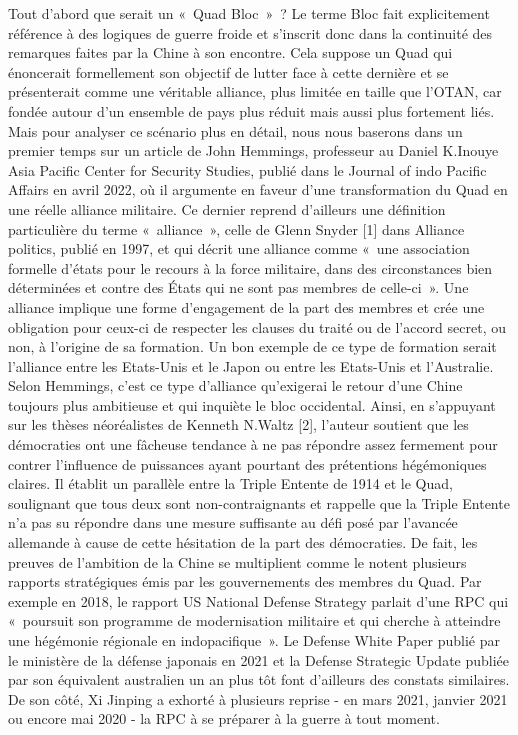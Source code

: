 \documentclass[11pt,a4paper]{article}
\begin{document}
Tout d'abord que serait un «~Quad Bloc~»~? Le terme Bloc fait explicitement référence à des logiques de guerre froide et s'inscrit donc dans la continuité des remarques faites par la Chine à son encontre. Cela suppose un Quad qui énoncerait formellement son objectif de lutter face à cette dernière et se présenterait comme une véritable alliance, plus limitée en taille que l'OTAN, car fondée autour d'un ensemble de pays plus réduit mais aussi plus fortement liés. Mais pour analyser ce scénario plus en détail, nous nous baserons dans un premier temps sur un article de John Hemmings, professeur au Daniel K.Inouye Asia Pacific Center for Security Studies, publié dans le Journal of indo Pacific Affairs en avril 2022, où il argumente en faveur d'une transformation du Quad en une réelle alliance militaire. Ce dernier reprend d'ailleurs une définition particulière du terme «~alliance~», celle de Glenn Snyder {[}1{]} dans Alliance politics, publié en 1997, et qui décrit une alliance comme «~une association formelle d'états pour le recours à la force militaire, dans des circonstances bien déterminées et contre des États qui ne sont pas membres de celle-ci~». Une alliance implique une forme d'engagement de la part des membres et crée une obligation pour ceux-ci de respecter les clauses du traité ou de l'accord secret, ou non, à l'origine de sa formation. Un bon exemple de ce type de formation serait l'alliance entre les Etats-Unis et le Japon ou entre les Etats-Unis et l'Australie. Selon Hemmings, c'est ce type d'alliance qu'exigerai le retour d'une Chine toujours plus ambitieuse et qui inquiète le bloc occidental. Ainsi, en s'appuyant sur les thèses néoréalistes de Kenneth N.Waltz {[}2{]}, l'auteur soutient que les démocraties ont une fâcheuse tendance à ne pas répondre assez fermement pour contrer l'influence de puissances ayant pourtant des prétentions hégémoniques claires. Il établit un parallèle entre la Triple Entente de 1914 et le Quad, soulignant que tous deux sont non-contraignants et rappelle que la Triple Entente n'a pas su répondre dans une mesure suffisante au défi posé par l'avancée allemande à cause de cette hésitation de la part des démocraties. De fait, les preuves de l'ambition de la Chine se multiplient comme le notent plusieurs rapports stratégiques émis par les gouvernements des membres du Quad. Par exemple en 2018, le rapport US National Defense Strategy parlait d'une RPC qui «~poursuit son programme de modernisation militaire et qui cherche à atteindre une hégémonie régionale en indopacifique~». Le Defense White Paper publié par le ministère de la défense japonais en 2021 et la Defense Strategic Update publiée par son équivalent australien un an plus tôt font d'ailleurs des constats similaires. De son côté, Xi Jinping a exhorté à plusieurs reprise - en mars 2021, janvier 2021 ou encore mai 2020 - la RPC à se préparer à la guerre à tout moment.
\end{document}
